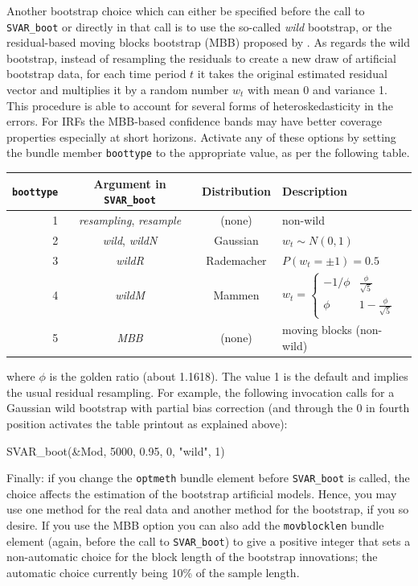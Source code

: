 \documentclass[a4paper,10pt]{article}
\newcounter{script}[section]
\begin{document}
Another bootstrap choice which can either be specified before the call to
\texttt{SVAR\_boot} or directly in that call is to use the so-called 
\emph{wild} bootstrap, or the residual-based moving blocks bootstrap (MBB)
proposed by \cite{BrugJenTrenk16}.
As regards the wild bootstrap, instead of resampling the residuals to create 
a new draw of artificial
bootstrap data, for each time period $t$ it takes the original
estimated residual vector and multiplies it by a random number $w_t$
with mean 0 and variance 1. This procedure is able to account for
several forms of heteroskedasticity in the errors. For IRFs the MBB-based 
confidence bands may have better coverage properties especially at short
horizons.
Activate any of these
options by setting the bundle member \texttt{boottype} to the
appropriate value, as per the following table. 
\begin{center}
\begin{tabular}{rccl}
  \hline
  \texttt{boottype} & Argument in \texttt{SVAR\_boot} & Distribution & Description\\
  \hline
  1 & \emph{resampling}, \emph{resample} & (none) & non-wild\\
  2 & \emph{wild}, \emph{wildN} & Gaussian & $w_t \sim N(0,1)$ \\
  3 & \emph{wildR} & Rademacher & $P(w_t = \pm 1) = 0.5$ \\
  4 & \emph{wildM} & Mammen & $w_t = \begin{cases}
    -1/\phi &  \frac{\phi}{\sqrt{5}} \\
    \phi & 1 - \frac{\phi}{\sqrt{5}}
  \end{cases}$ \\
  5 & \emph{MBB} & (none) & moving blocks (non-wild) \\
  \hline
\end{tabular}
\end{center}
where $\phi$ is the golden ratio (about 1.1618).
The value 1 is the default and
implies the usual residual resampling. For example, the following invocation
calls for a Gaussian wild bootstrap with partial bias correction (and through the 0 in
fourth position activates the table printout as explained above):
\begin{code}
SVAR_boot(&Mod, 5000, 0.95, 0, "wild", 1)
\end{code}

Finally: if you change the \texttt{optmeth} bundle element before
\texttt{SVAR\_boot} is called, the choice affects the estimation of
the bootstrap artificial models. Hence, you may use one method for the
real data and another method for the bootstrap, if you so desire. 
If you use the MBB option you can also add the \texttt{movblocklen} 
bundle element (again, before the call to \texttt{SVAR\_boot}) to give a 
positive integer that sets a non-automatic choice for the block length of the
bootstrap innovations; the automatic choice currently being 10\% of the 
sample length.
\end{document}
